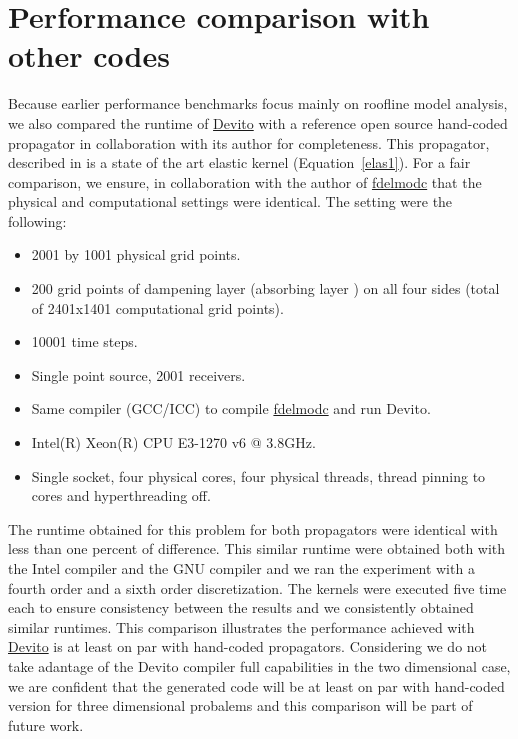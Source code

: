 \documentclass[conference]{IEEEtran}
\begin{document}
\section{Performance comparison with other
codes}\label{performance-comparison-with-other-codes}

Because earlier performance benchmarks focus mainly on roofline model
analysis, we also compared the runtime of \href{https://github.com/devitocodes/devito}{Devito} with a reference
open source hand-coded propagator in collaboration with its author for
completeness. This propagator, described in \cite{thorbecke} is a
state of the art elastic kernel (Equation~\ref{elas1}). For a fair
comparison, we ensure, in collaboration with the author of
\href{https://github.com/JanThorbecke/OpenSource.git}{fdelmodc} that the
physical and computational settings were identical. The setting were the
following:

\begin{itemize}
\itemsep1pt\parskip0pt
\item
  2001 by 1001 physical grid points.
\item
  200 grid points of dampening layer (absorbing layer \cite{cerjan}) on
  all four sides (total of 2401x1401 computational grid points).
\item
  10001 time steps.
\item
  Single point source, 2001 receivers.
\item
  Same compiler (GCC/ICC) to compile
  \href{https://github.com/JanThorbecke/OpenSource.git}{fdelmodc} and
  run Devito.
\item
  Intel(R) Xeon(R) CPU E3-1270 v6 @ 3.8GHz.
\item
  Single socket, four physical cores, four physical threads, thread
  pinning to cores and hyperthreading off.
\end{itemize}

The runtime obtained for this problem for both propagators were identical
with less than one percent of difference. This similar runtime were
obtained both with the Intel compiler and the GNU compiler and we ran the
experiment with a fourth order and a sixth order discretization.  The
kernels were executed five time each to ensure consistency between the
results and we consistently obtained similar runtimes. This comparison
illustrates the performance achieved with \href{https://github.com/devitocodes/devito}{Devito} is at least on par with
hand-coded propagators. Considering we do not take adantage of the Devito
compiler full capabilities in the two dimensional case, we are confident
that the generated code will be at least on par with hand-coded version
for three dimensional probalems and this comparison will be part of future
work.
\end{document}

